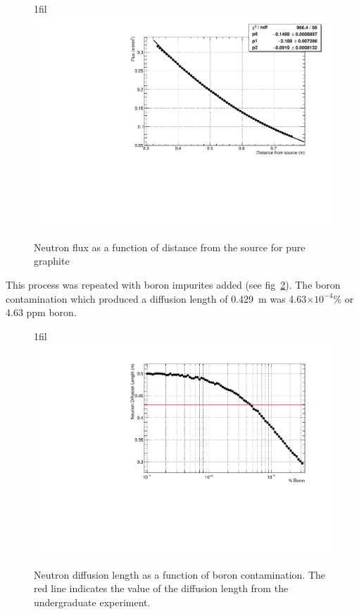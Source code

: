 \documentclass{article}
\makeatletter
\newcommand*{\centerfloat}{%
  \parindent \z@
  \leftskip \z@ \@plus 1fil \@minus \textwidth
  \rightskip\leftskip
  \parfillskip \z@skip}
\makeatother
\begin{document}
\begin{figure}
	\centerfloat
	\includegraphics[width=\columnwidth]{images/fluxVsR}
	\caption{Neutron flux as a function of distance from the source for pure graphite}	
	\label{fig:neutronFlux}
\end{figure}


This process was repeated with boron impurites added (see fig~\ref{fig:neutronDiffLength}). The boron contamination which produced a diffusion length of 0.429~m was 4.63$\times10^{-4}$\% or 4.63 ppm boron.


\begin{figure}
	\centerfloat
	\includegraphics[width=\columnwidth]{images/DiffusionTuning_100}
	\caption{Neutron diffusion length as a function of boron contamination. The red line indicates the value of the diffusion length from the undergraduate experiment.}	
	\label{fig:neutronDiffLength}
\end{figure}
\end{document}

